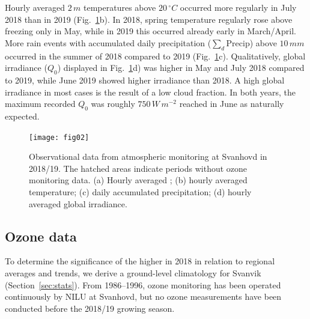 \documentclass[bg, manuscript]{copernicus}
\begin{document}
Hourly averaged $2\,\unit{m}$ temperatures above $20\,\unit{^\circ C}$ occurred more regularly in July 2018 than in 2019 (Fig.~\ref{fig:data_svanvik_2018_2019}b). In 2018, spring temperature regularly rose above freezing only in May, while in 2019 this occurred already early in March/April.
More rain events with accumulated daily precipitation ($\sum_d \mathrm{Precip}$) above $10\,\unit{mm}$ occurred in the summer of 2018 compared to 2019 (Fig.~\ref{fig:data_svanvik_2018_2019}c).
Qualitatively, global irradiance ($Q_0$) displayed in Fig.~\ref{fig:data_svanvik_2018_2019}d) was higher in May and July 2018 compared to 2019, while June 2019 showed higher irradiance than 2018. A high global irradiance in most cases is the result of a low cloud fraction. In both years, the maximum recorded $Q_0$ was roughly $750\,\unit{W\,m^{-2}}$ reached in June as naturally expected.

\begin{figure}[t]
  \texttt{[image: fig02]}
  \caption{Observational data from atmospheric monitoring at Svanhovd in 2018/19. The hatched areas indicate periods without ozone monitoring data. (a) Hourly averaged \chem{[O_3]}; (b) hourly averaged temperature; (c) daily accumulated precipitation; (d) hourly averaged global irradiance.}
  \label{fig:data_svanvik_2018_2019}
\end{figure}

\subsection{Ozone data}
\label{subsec:ozone_data}
To determine the significance of the higher \chem{[O_3]} in 2018 in relation to regional averages and trends, we derive a ground-level \chem{[O_3]} climatology for Svanvik (Section~\ref{sec:stats}). From 1986--1996, ozone monitoring has been operated continuously by NILU at Svanhovd, but no ozone measurements have been conducted before the 2018/19 growing season.
\end{document}
